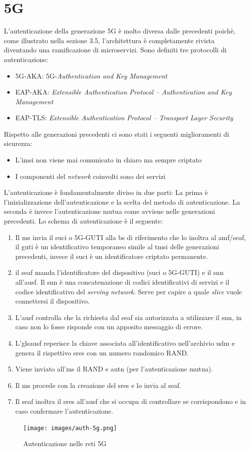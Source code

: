 \clearpage

\section{5G}
L'autenticazione della generazione 5G è molto diversa dalle precedenti poichè, come illustrato nella sezione 3.5, l'architettura è completamente rivista diventando una ramificazione di microservizi.
Sono definiti tre protocolli di autenticazione:
\begin{itemize}
    \item 5G-AKA: 5G-\textit{Authentication and Key Management}
    \item EAP-AKA: \textit{Extensible Authentication Protocol – Authentication and Key Management}
    \item EAP-TLS: \textit{Extensible Authentication Protocol – Transport Layer Security}
\end{itemize}
Rispetto alle generazioni precedenti ci sono stati i seguenti miglioramenti di sicurezza\cite{5g-vs-4g}:
\begin{itemize}
    \item L'\gls{imsi} non viene mai comunicato in chiaro ma sempre criptato
    \item I componenti del \textit{network} coinvolti sono dei servizi
\end{itemize}
L'autenticazione è fondamentalmente diviso in due parti: La prima è l'inizializzazione dell'autenticazione e la scelta del metodo di autenticazione.
La seconda è invece l'autenticazione mutua come avviene nelle generazioni precedenti.
Lo schema di autenticazione è il seguente\cite{5g-auth}:
\begin{enumerate}
    \item Il \gls{ms} invia il \gls{suci} o 5G-GUTI alla \gls{bs} di riferimento che lo inoltra al \gls{amf}/\gls{seaf},
    il \gls{guti} è un identificativo temporaneo simile al \gls{tmsi} delle generazioni precedenti, invece il \gls{suci} è un identificatore criptato
    permanente.
    \item il \gls{seaf} manda l'identificatore del dispositivo (\gls{suci} o 5G-GUTI) e il \gls{snn} all'\gls{ausf}.
    Il \gls{snn} è una concatenazione di codici identificativi di servizi e il codice identificativo del \textit{serving network}. Serve per capire 
    a quale \textit{slice} vuole connettersi il dispositivo.
    \item L'\gls{ausf} controlla che la richiesta dal \gls{seaf} sia autorizzata a utilizzare il \gls{snn}, in caso non lo fosse risponde con un 
    apposito messaggio di errore.
    \item L'gls{ausf} reperisce la chiave associata all'identificativo nell'archivio \gls{udm} e genera il rispettivo \gls{sres} con un numero randomico RAND.
    \item Viene inviato all'\gls{ms} il RAND e \gls{autn} (per l'autenticazione mutua).
    \item Il \gls{ms} procede con la creazione del \gls{sres} e lo invia al \gls{seaf}.
    \item Il \gls{seaf} inoltra il \gls{sres} all'\gls{ausf} che si occupa di controllare se corrispondono e in caso confermare l'autenticazione.
\end{enumerate}
\begin{figure}[h]
    \centering
    \texttt{[image: images/auth-5g.png]}
    \caption{Autenticazione nelle reti 5G}
\end{figure}